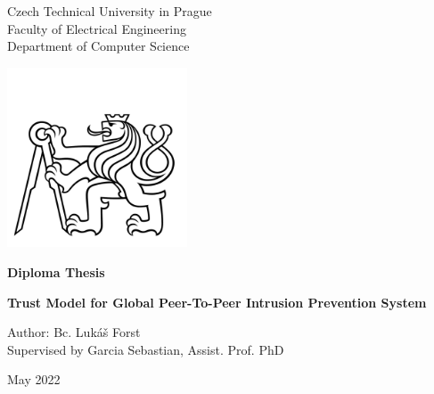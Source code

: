

\begin{titlepage}
    \begin{center}
        
        \LARGE
        Czech Technical University in Prague\\
        Faculty of Electrical Engineering\\
        Department of Computer Science
        
        \includegraphics[width=0.4\textwidth]{assets/ctu_blackwhite.jpg}

        \Large
        \textbf{Diploma Thesis}
        
        \vfill
        
        \vspace*{0.5cm}
        \LARGE
        \textbf{Trust Model for Global Peer-To-Peer Intrusion Prevention System} 
        
        \vfill

        \large
        Author: Bc. Lukáš Forst \\
        Supervised by Garcia Sebastian, Assist. Prof. PhD
        
        \vspace{0.8cm}

        \Large
        May 2022

    \end{center}
\end{titlepage}

\thispagestyle{empty}
\cleardoublepage
